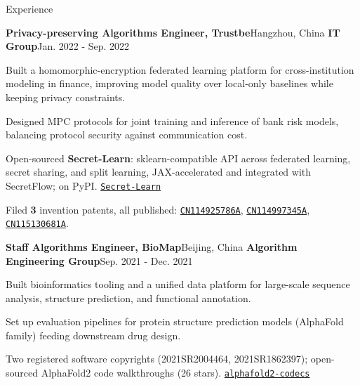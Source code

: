\documentclass{resume} %
\newcommand{\repo}[2]{\href{#2}{\small\nolinkurl{#1}}}
\begin{document}
\begin{rSection}{Experience}
\begin{rSubsection}{\textbf{Privacy-preserving Algorithms Engineer, Trustbe}}{Hangzhou, China}
{\textbf{IT Group}}{Jan. 2022 - Sep. 2022}
\item {Built a homomorphic-encryption federated learning platform for cross-institution modeling in finance, improving model quality over local-only baselines while keeping privacy constraints.}\\
\item {Designed MPC protocols for joint training and inference of bank risk models, balancing protocol security against communication cost.}\\
\item {Open-sourced \textbf{Secret-Learn}: sklearn-compatible API across federated learning, secret sharing, and split learning, JAX-accelerated and integrated with SecretFlow; on PyPI. \repo{Secret-Learn}{https://github.com/chenxingqiang/Secret-Learn}}\\
\item {Filed \textbf{3} invention patents, all published: \repo{CN114925786A}{https://patents.google.com/patent/CN114925786A/en}, \repo{CN114997345A}{https://patents.google.com/patent/CN114997345A/en}, \repo{CN115130681A}{https://patents.google.com/patent/CN115130681A/en}.}\\
\end{rSubsection}

\begin{rSubsection}{\textbf{Staff Algorithms Engineer, BioMap}}{Beijing, China}
{\textbf{Algorithm Engineering Group}}{Sep. 2021 - Dec. 2021}
\item {Built bioinformatics tooling and a unified data platform for large-scale sequence analysis, structure prediction, and functional annotation.}\\
\item {Set up evaluation pipelines for protein structure prediction models (AlphaFold family) feeding downstream drug design.}\\
\item {Two registered software copyrights (2021SR2004464, 2021SR1862397); open-sourced AlphaFold2 code walkthroughs (26 stars). \repo{alphafold2-codecs}{https://github.com/chenxingqiang/alphafold2-codecs}}\\
\end{rSubsection}


\end{rSection}
\end{document}
